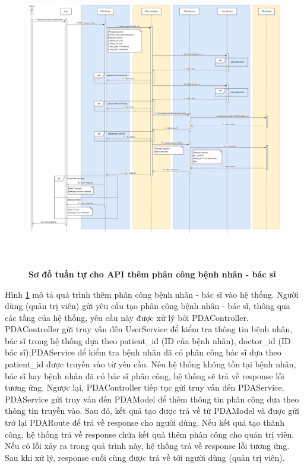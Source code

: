 \begin{figure}[H]
  \centering
  \includegraphics[width=16cm,height=13cm]{Images/sequence_api/addAssignment.png}
  \caption[Sơ đồ tuần tự cho API thêm phân công bệnh nhân - bác sĩ]{\bfseries \fontsize{12pt}{0pt}
  \selectfont Sơ đồ tuần tự cho API thêm phân công bệnh nhân - bác sĩ }
  \label{addPDA} %
\end{figure}
Hình \ref{addPDA} mô tả quá trình thêm phân công bệnh nhân - bác sĩ vào hệ thống. Người dùng (quản trị viên) gửi yêu cầu tạo phân công bệnh nhân - bác sĩ, thông qua các tầng của hệ thống, 
yêu cầu này được xử lý bởi PDAController. PDAController gửi truy vấn đến UserService để kiểm tra thông tin bệnh nhân, bác sĩ trong hệ thống dựa theo patient\_id (ID của bệnh nhân), doctor\_id (ID bác sĩ);PDAService để kiểm
tra bệnh nhân đã có phân công bác sĩ dựa theo patient\_id được truyền vào từ yêu cầu. Nếu hệ thống không tồn tại bệnh nhân, bác sĩ hay bệnh nhân đã có bác sĩ phân công, hệ thống sẽ trả về response lỗi tương ứng. 
Ngược lại, PDAController tiếp tục gửi truy vấn đến PDAService, PDAService gửi truy vấn đến PDAModel để thêm thông tin phân công dựa theo thông tin truyền vào. Sau đó, kết quả tạo được trả về từ PDAModel và được gửi trở lại 
PDARoute để trả về response cho người dùng. Nếu kết quả tạo thành công, hệ thống trả về response chứa kết quả thêm phân công cho quản trị viên. 
Nếu có lỗi xảy ra trong quá trình này, hệ thống trả về response lỗi tương ứng. Sau khi xử lý, response cuối cùng được trả về tới người dùng (quản trị viên).

